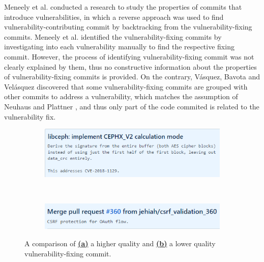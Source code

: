 \documentclass[12pt, a4paper]{report}
\begin{document}
Meneely et al. \cite{meneely_2013} conducted a research to study the properties of commits that
introduce vulnerabilities, in which a reverse approach was used to find vulnerability-contributing
commit by backtracking from the vulnerability-fixing commits. Meneely et al. identified the
vulnerability-fixing commits by investigating into each vulnerability manually to find the
respective fixing commit. However, the process of identifying vulnerability-fixing commit was not
clearly explained by them, thus no constructive information about the properties of
vulnerability-fixing commits is provided. On the contrary, V{\'a}squez, Bavota and Vel{\'a}squez
\cite{linares_2017} discovered that some vulnerability-fixing commits are grouped with other commits
to address a vulnerability, which matches the assumption of Neuhaus and Plattner
\cite{neuhaus_2013}, and thus only part of the code commited is related to the vulnerability fix.

\begin{figure}[H]
  \centering
  \begin{subfigure}{\textwidth}
    \centering
    \includegraphics{images/vuln_fixing_commit_good_ex.png}
  \end{subfigure} \\
  \begin{subfigure}{\textwidth}
    \centering
    \includegraphics[width=\textwidth]{images/vuln_fixing_commit_bad_ex.png}
  \end{subfigure}
  \caption[Examples of vulnerability-fixing commit]%
  {A comparison of \hyperref[figure:g_vfc]{\textbf{(a)}} a higher quality and
  \hyperref[figure:bad_vfc]{\textbf{(b)}} a lower quality vulnerability-fixing commit.}
  \label{figure:comparion_vfc}
\end{figure}
\end{document}
